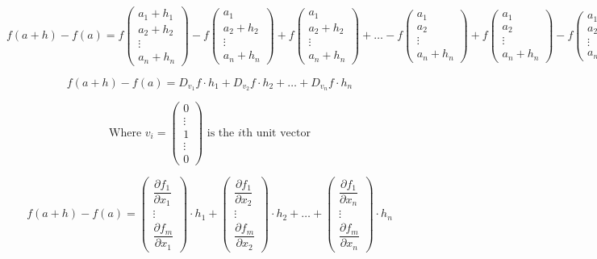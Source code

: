 \documentclass[11pt]{article}
\begin{document}
\[
f(a + h) - f(a) = f\begin{pmatrix}
    a_1 + h_1 \\
    a_2 + h_2 \\
    \vdots \\
    a_n + h_n
\end{pmatrix} - f\begin{pmatrix}
    a_1 \\
    a_2 + h_2\\
    \vdots \\
    a_n + h_n
\end{pmatrix} + f\begin{pmatrix}
    a_1 \\
    a_2 + h_2 \\
    \vdots \\
    a_n + h_n
\end{pmatrix} + \ldots - f\begin{pmatrix}
    a_1 \\
    a_2 \\
    \vdots \\
    a_n + h_n
\end{pmatrix} + f\begin{pmatrix}
    a_1 \\
    a_2 \\
    \vdots \\
    a_n + h_n
\end{pmatrix} - f\begin{pmatrix}
    a_1 \\
    a_2 \\
    \vdots \\
    a_n
\end{pmatrix}
\]

\[
f(a + h) - f(a) = D_{v_1} f \cdot h_1 + D_{v_2} f \cdot h_2 + \ldots + D_{v_n} f \cdot h_n
\]

\[
\text{Where } v_i = \begin{pmatrix}
    0 \\
    \vdots \\
    1 \\
    \vdots \\
    0
\end{pmatrix} \text{ is the } i \text{th unit vector}
\]

\[
f(a + h) - f(a) = \begin{pmatrix}
    \dfrac{\partial f_1}{\partial x_1} \\
    \vdots \\
    \dfrac{\partial f_m}{\partial x_1}
\end{pmatrix} \cdot h_1 + \begin{pmatrix}
    \dfrac{\partial f_1}{\partial x_2} \\
    \vdots \\
    \dfrac{\partial f_m}{\partial x_2}
\end{pmatrix} \cdot h_2 + \ldots + \begin{pmatrix}
    \dfrac{\partial f_1}{\partial x_n} \\
    \vdots \\
    \dfrac{\partial f_m}{\partial x_n}
\end{pmatrix} \cdot h_n
\]
\end{document}
